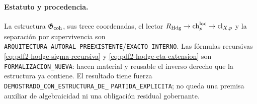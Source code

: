 \paragraph{Estatuto y procedencia.}
La estructura $\mathfrak G_{\rm coh}$, sus trece coordenadas, el lector
$R_{\rm Hdg}\to\operatorname{ch}^{\rm loc}_p\to\operatorname{cl}_{X,p}$
y la separación por supervivencia son
\texttt{ARQUITECTURA\_AUTORAL\_PREEXISTENTE}/\texttt{EXACTO\_INTERNO}.
Las fórmulas recursivas
\eqref{eq:pdf2-hodge-sigma-recursiva} y
\eqref{eq:pdf2-hodge-eta-extension} son
\texttt{FORMALIZACION\_NUEVA}: hacen material y reusable el inverso derecho
que la estructura ya contiene. El resultado tiene fuerza
\texttt{DEMOSTRADO\_CON\_ESTRUCTURA\_DE\_}\allowbreak
\texttt{PARTIDA\_EXPLICITA}; no queda una
premisa auxiliar de algebraicidad ni una obligación residual gobernante.
